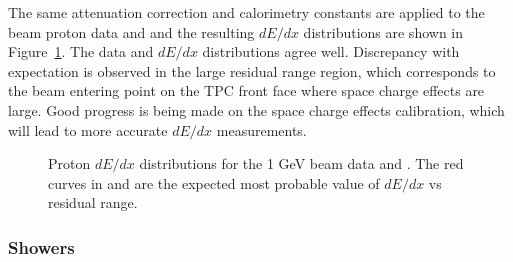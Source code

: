 The same attenuation correction and calorimetry constants are applied to the beam proton data and  and the resulting $dE/dx$ distributions are shown in Figure~\ref{fig:pandora_protodune_proton}. The data and  $dE/dx$ distributions agree well. Discrepancy with expectation is observed in the large residual range region, which corresponds to the beam entering point on the TPC front face where space charge effects are large. Good progress is being made on the space charge effects calibration, which will lead to more accurate $dE/dx$ measurements.
\begin{figure}[!ht]
\centering
{}
\caption[Proton $dE/dx$ distributions for the  1 GeV beam data and ]{Proton $dE/dx$ distributions for the  1 GeV beam data and . The red curves in \protect{} and \protect{} are the expected most probable value of $dE/dx$ vs residual range.}
\label{fig:pandora_protodune_proton}
\end{figure}


\subsubsection{Showers}
\label{sec:Pandora:High:Showers}

